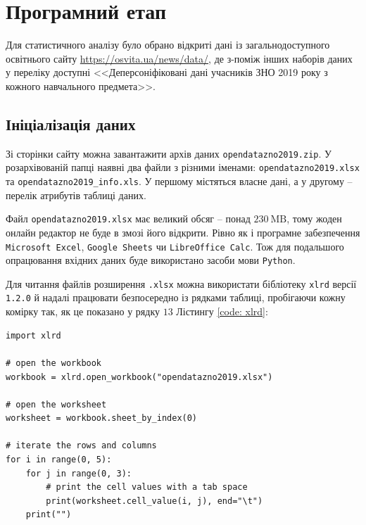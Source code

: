 \section*{Програмний етап}

Для статистичного аналізу було обрано відкриті дані із загальнодоступного освітнього сайту 
\url{https://osvita.ua/news/data/}, де з-поміж інших наборів даних у переліку доступні 
<<Деперсоніфіковані дані учасників ЗНО 2019 року з кожного навчального предмета>>.

\subsection*{Ініціалізація даних}

Зі сторінки сайту можна завантажити архів даних \texttt{opendatazno2019.zip}. У роз\-архівованій папці 
наявні два файли з різними іменами: \texttt{opendatazno2019.xlsx} та \texttt{opendatazno2019\_info.xls}. 
У першому містяться власне дані, а у другому -- перелік атрибутів таблиці даних.  

Файл \texttt{opendatazno2019.xlsx} має великий обсяг -- понад $230\ \text{MB}$, тому жоден онлайн редактор не 
буде в змозі його відкрити. Рівно як і програмне забезпечення \texttt{Microsoft Excel}, \texttt{Google Sheets} 
чи \texttt{LibreOffice Calc}. Тож для подальшого опрацювання вхідних даних буде використано засоби мови \texttt{Python}. 

Для читання файлів розширення \texttt{.xlsx} можна використати бібліотеку \texttt{xlrd} версії \texttt{1.2.0} 
й надалі працювати безпосередно із рядками таблиці, пробігаючи кожну комірку так, як це показано у рядку $13$ 
Лістингу  \ref{code: xlrd}:

% 

\begin{lstlisting}[firstnumber=1, label = code: xlrd, caption = Використання бібліотеки xlrd]
import xlrd

# open the workbook
workbook = xlrd.open_workbook("opendatazno2019.xlsx")
    
# open the worksheet
worksheet = workbook.sheet_by_index(0)
    
# iterate the rows and columns
for i in range(0, 5):
    for j in range(0, 3):
        # print the cell values with a tab space
        print(worksheet.cell_value(i, j), end="\t")
    print("")
\end{lstlisting}

